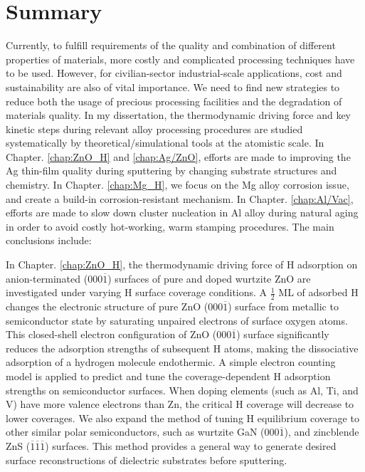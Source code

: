 \section{Summary}

Currently, to fulfill requirements of the quality and combination of different properties of materials, more costly and complicated processing techniques have to be used. However, for civilian-sector industrial-scale applications, cost and sustainability are also of vital importance. We need to find new strategies to reduce both the usage of precious processing facilities and the degradation of materials quality. In my dissertation, the thermodynamic driving force and key kinetic steps during relevant alloy processing procedures are studied systematically by theoretical/simulational tools at the atomistic scale. In Chapter. \ref{chap:ZnO_H} and \ref{chap:Ag/ZnO}, efforts are made to improving the Ag thin-film quality during sputtering by changing substrate structures and chemistry. In Chapter. \ref{chap:Mg_H}, we focus on the Mg alloy corrosion issue, and create a build-in corrosion-resistant mechanism. In Chapter. \ref{chap:Al/Vac}, efforts are made to slow down cluster nucleation in Al alloy during natural aging in order to avoid costly hot-working, warm stamping procedures. The main conclusions include:

In Chapter. \ref{chap:ZnO_H}, the thermodynamic driving force of H adsorption on anion-terminated (000$\overline{1}$) surfaces of pure and doped wurtzite ZnO are investigated under varying H surface coverage conditions. A $\frac{1}{2}$ \ac{ML} of adsorbed H changes the electronic structure of pure ZnO (000$\overline{1}$) surface from metallic to semiconductor state by saturating unpaired electrons of surface oxygen atoms. This closed-shell electron configuration of ZnO (000$\overline{1}$) surface significantly reduces the adsorption strengths of subsequent H atoms, making the dissociative adsorption of a hydrogen molecule endothermic. A simple electron counting model is applied to predict and tune the coverage-dependent H adsorption strengths on semiconductor surfaces. When doping elements (such as Al, Ti, and V) have more valence electrons than Zn, the critical H coverage will decrease to lower coverages. We also expand the method of tuning H equilibrium coverage to other similar polar semiconductors, such as wurtzite GaN (000$\overline{1}$), and zincblende ZnS ($\overline{1}$$\overline{1}$$\overline{1}$) surfaces. This method provides a general way to generate desired surface reconstructions of dielectric substrates before sputtering.


